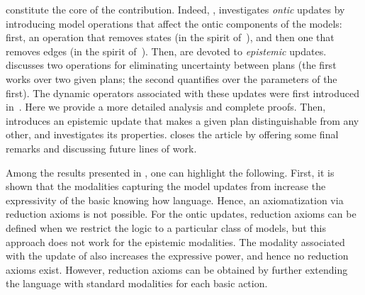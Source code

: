  constitute the core of the contribution. Indeed, , investigates \emph{ontic} updates by introducing model operations that affect the ontic components of the models: first, an operation that removes states (in the spirit of~\cite{Plaza89:lopc}), and then one that removes edges (in the spirit of~\cite{KooiR11}). Then,  are devoted to \emph{epistemic} updates.  discusses two operations for eliminating uncertainty between plans (the first works over two given plans; the second quantifies over the parameters of the first). The dynamic operators associated with these updates were first introduced in~\cite{AFSV22}. Here we provide a more detailed analysis and complete proofs. Then, 
introduces an epistemic update that makes a given plan distinguishable from any other, and investigates its properties.  closes the article by offering some final remarks and discussing future lines of work.

Among the results presented in , one can highlight the following. First, it is  shown that the modalities capturing the model updates from  increase the expressivity of the basic knowing how language. Hence, an axiomatization via reduction axioms is not possible. For the ontic updates, reduction axioms can be defined when we restrict the logic to a particular class of models, but this approach does not work for the epistemic modalities. The modality associated with the update of  also increases the expressive power, and hence no reduction axioms exist. However, reduction axioms can be obtained by further extending the language with standard modalities for each basic action. 
 
